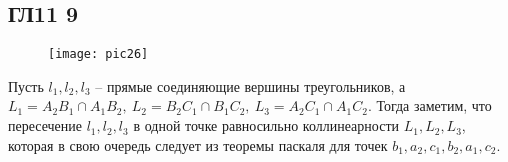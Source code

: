 \subsection*{ГЛ11 9}
\begin{figure}[h]
	\center\texttt{[image: pic26]}
\end{figure}
\noindent
Пусть $l_1, l_2, l_3$ -- прямые соединяющие вершины треугольников, а $L_1 = A_2B_1 \cap A_1B_2,\ L_2 = B_2C_1 \cap B_1C_2,\ L_3 = A_2C_1 \cap A_1C_2$. Тогда заметим, что пересечение $l_1, l_2, l_3$ в одной точке равносильно коллинеарности $L_1, L_2, L_3$, которая в свою очередь следует из теоремы паскаля для точек $b_1, a_2, c_1, b_2, a_1, c_2$.